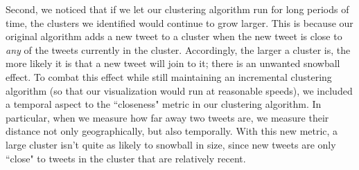 \documentclass[pdftex,12pt,a4paper]{article}
\begin{document}
Second, we noticed that if we let our clustering algorithm run for long periods of time, the clusters we identified would continue to grow larger. This is because our original algorithm adds a new tweet to a cluster when the new tweet is close to \emph{any} of the tweets currently in the cluster. Accordingly, the larger a cluster is, the more likely it is that a new tweet will join to it; there is an unwanted snowball effect. To combat this effect while still maintaining an incremental clustering algorithm (so that our visualization would run at reasonable speeds), we included a temporal aspect to the ``closeness" metric in our clustering algorithm. In particular, when we measure how far away two tweets are, we measure their distance not only geographically, but also temporally. With this new metric, a large cluster isn't quite as likely to snowball in size, since new tweets are only ``close" to tweets in the cluster that are relatively recent. 
\end{document}
